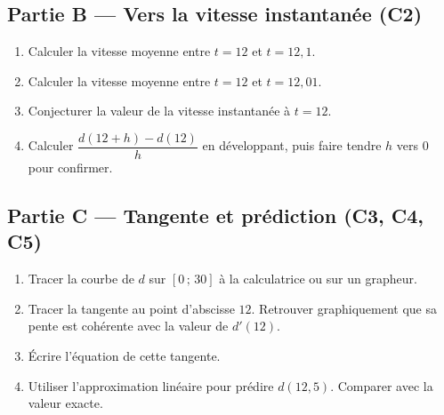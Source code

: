 \subsection*{Partie B — Vers la vitesse instantanée (C2)}

\begin{enumerate}[resume]
  \item Calculer la vitesse moyenne entre $t=12$ et $t=12{,}1$.
  \item Calculer la vitesse moyenne entre $t=12$ et $t=12{,}01$.
  \item Conjecturer la valeur de la vitesse instantanée à $t=12$.
  \item Calculer $\dfrac{d(12+h)-d(12)}{h}$ en développant, puis faire tendre $h$ vers $0$ pour confirmer.
\end{enumerate}


\subsection*{Partie C — Tangente et prédiction (C3, C4, C5)}

\begin{enumerate}[resume]
  \item Tracer la courbe de $d$ sur $[0\,;\,30]$ à la calculatrice ou sur un grapheur.
  \item Tracer la tangente au point d'abscisse $12$. Retrouver graphiquement que sa pente est cohérente avec la valeur de $d'(12)$.
  \item Écrire l'équation de cette tangente.
  \item Utiliser l'approximation linéaire pour prédire $d(12{,}5)$. Comparer avec la valeur exacte.
\end{enumerate}


